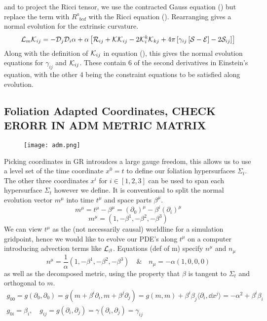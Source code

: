 and to project the Ricci tensor, we use the contracted Gauss equation () but replace the term with $R^a_{\,\,\,bcd}$ with the Ricci equation (). Rearranging gives a normal evolution for the extrinsic curvature.
\begin{equation} \mathcal{L}_m \mathcal{K}_{ij} = -\mathcal{D}_j\mathcal{D}_i \alpha + \alpha \left[ \mathcal{R}_{ij} + \mathcal{K}\mathcal{K}_{ij} - 2\mathcal{K}^k_i\mathcal{K}_{kj} + 4\pi \left[ \gamma_{ij}\left[ \mathcal{S}-\mathcal{E}\right]-2\mathcal{S}_{ij}\right]\right]\end{equation}
Along with the definition of $\mathcal{K}_{ij}$ in equation (), this gives the normal evolution equations for $\gamma_{ij}$ and $\mathcal{K}_{ij}$. These contain 6 of the second derivatives in Einstein's equation, with the other 4 being the constraint equations to be satisfied along evolution.

\subsection{Foliation Adapted Coordinates, CHECK ERORR IN ADM METRIC MATRIX}
\begin{wrapfigure}{r}{0.65\textwidth}
    \texttt{[image: adm.png]}
\end{wrapfigure}
Picking coordinates in GR introudces a large gauge freedom, this allows us to use a level set of the time coordinate $x^0=t$ to define our foliation hypersurfaces $\Sigma_t$. The other three coordinates $x^i$ for $i\in[1,2,3]$ can be used to span each hypersurface $\Sigma_t$ however we define. It is conventional to split the normal evolution vector $m^\mu$ into time $t^\mu$ and space parts $\beta^\mu$.
\[ m^\mu = t^\mu - \beta^\mu  = (\partial_0)^\mu - \beta^i (\partial_i)^\mu \]
\[ m^\mu = \left( 1,-\beta^1,-\beta^2,-\beta^3\right) \]
We can view $t^\mu$ as the (not necessarily causal) worldline for a simulation gridpoint, hence we would like to evolve our PDE's along $t^\mu$ on a computer introducing advection terms like $\mathcal{L}_\beta$. Equations (def of m) specify $n^\mu$ and $n_\mu$
\begin{equation} n^\mu =  \frac{1}{\alpha}\left( 1,-\beta^1,-\beta^2,-\beta^3\right)\quad \& \quad n_\mu = -\alpha\left( 1,0,0,0\right)\end{equation}
as well as the decomposed metric, using the property that $\beta$ is tangent to $\Sigma_t$ and orthogonal to $m$.
\begin{gather} g_{00} = g(\partial_0,\partial_0) = g(m + \beta^i \partial_i,m + \beta^j\partial_j) = g(m,m) + \beta^i \beta_j \langle \partial_i,\dd x^j \rangle = -\alpha^2 + \beta^i \beta_i \nonumber\\
 g_{0i} = \beta_i,\quad
 g_{ij} = g(\partial_i,\partial_j) = \gamma(\partial_i,\partial_j) = \gamma_{ij}\nonumber\end{gather}
